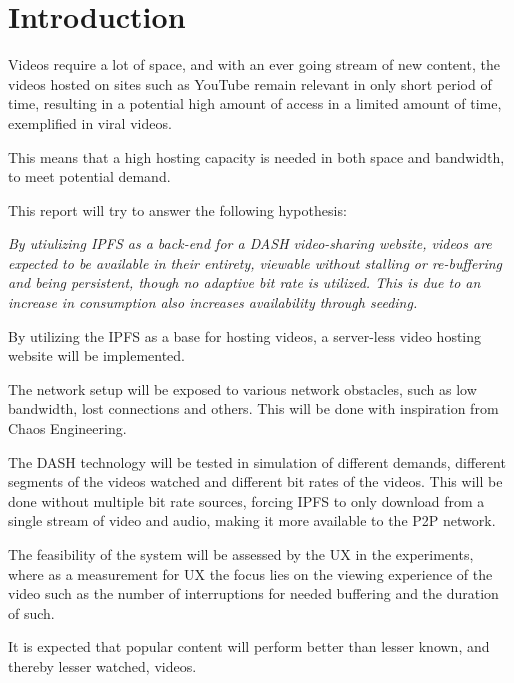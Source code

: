 \chapter{Introduction}
\label{cha:introduction}
Videos require a lot of space, and with an ever going stream of new content, the videos hosted on sites such as YouTube remain relevant in only short period of time, resulting in a potential high amount of access in a limited amount of time, exemplified in viral videos.

This means that a high hosting capacity is needed in both space and bandwidth, to meet potential demand.

This report will try to answer the following hypothesis:

\begin{displayquote}
    \textit{
        By utiulizing \ac{IPFS} as a back-end for a \ac{DASH} video-sharing website, videos are expected to be available in their entirety, viewable without stalling or re-buffering and being persistent, though no adaptive bit rate is utilized. This is due to an increase in consumption also increases availability through seeding.
    }
\end{displayquote}

By utilizing the \ac{IPFS} as a base for hosting videos, a server-less video hosting website will be implemented.

The network setup will be exposed to various network obstacles, such as low bandwidth, lost connections and others. This will be done with inspiration from Chaos Engineering.

The \ac{DASH} technology will be tested in simulation of different demands, different segments of the videos watched and different bit rates of the videos. This will be done without multiple bit rate sources, forcing IPFS to only download from a single stream of video and audio, making it more available to the \ac{P2P} network.

The feasibility of the system will be assessed by the \ac{UX} in the experiments, where as a measurement for \ac{UX} the focus lies on the viewing experience of the video such as the number of interruptions for needed buffering and the duration of such. 

It is expected that popular content will perform better than lesser known, and thereby lesser watched, videos.


